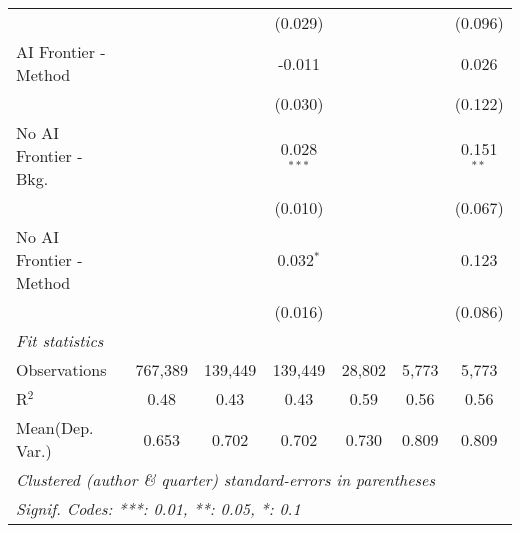 \begin{tabular}{lcccccc}
                           &              &               & (0.029)       &             &         & (0.096)\\   
   AI Frontier - Method    &              &               & -0.011        &             &         & 0.026\\   
                           &              &               & (0.030)       &             &         & (0.122)\\   
   No AI Frontier - Bkg.   &              &               & 0.028$^{***}$ &             &         & 0.151$^{**}$\\   
                           &              &               & (0.010)       &             &         & (0.067)\\   
   No AI Frontier - Method &              &               & 0.032$^{*}$   &             &         & 0.123\\   
                           &              &               & (0.016)       &             &         & (0.086)\\   
   \midrule
   \emph{Fit statistics}\\
   Observations            & 767,389      & 139,449       & 139,449       & 28,802      & 5,773   & 5,773\\  
   R$^2$                   & 0.48         & 0.43          & 0.43          & 0.59        & 0.56    & 0.56\\  
Mean(Dep. Var.) & 0.653 & 0.702 & 0.702 & 0.730 & 0.809 & 0.809 \\
   \midrule \midrule
   \multicolumn{7}{l}{\emph{Clustered (author \& quarter) standard-errors in parentheses}}\\
   \multicolumn{7}{l}{\emph{Signif. Codes: ***: 0.01, **: 0.05, *: 0.1}}\\
\end{tabular}
\par\endgroup
